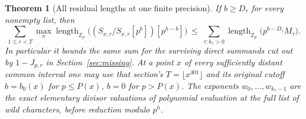 \documentclass[a4paper,11pt]{article}
\newtheorem{theorem}[proposition]{Theorem}
\theoremstyle{definition}
\theoremstyle{remark}
\newcommand{\ZZ}{\mathbb Z}\newcommand{\ord}{\operatorname{ord}}
\newcommand{\len}{\operatorname{length}}\newcommand{\Res}{\operatorname*{Res}}
\numberwithin{equation}{section}
\begin{document}
\begin{theorem}[All residual lengths at one finite precision]\leavevmode
\label{thm:jointlog322}
If \(b\ge D_\tau\) for every nonempty list, then
\[
 \sum_{1\le r<T}\max_x
 \len_{\ZZ_p}\big((S_{x,r}/S_{x,r}[p^b])[p^{h-b}]\big)
 \ \le\ \sum_{\tau:k_\tau>0}
                    \len_{\ZZ_p}\big(p^{b-D_\tau}M_\tau\big).
\]
In particular it bounds the same sum for the surviving
direct summands cut out by \(1-J_{p,r}\) in
Section~\ref{sec:missing}. At a point \(x\) of every
sufficiently distant common interval one may use that
section's \(T=\lfloor x^{401}\rfloor\) and its original
cutoff \(b=b_0(x)\) for \(p\le P(x)\), \(b=0\) for \(p>P(x)\).
The exponents \(w_0,\ldots,w_{k_\tau-1}\) are the exact
elementary divisor valuations of polynomial evaluation at
the full list of wild characters, before reduction modulo \(p^h\).
\end{theorem}
\end{document}
